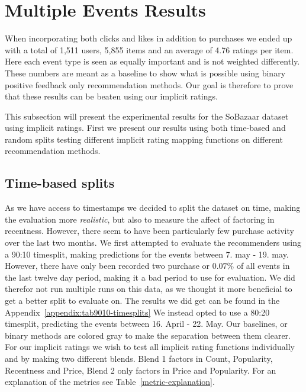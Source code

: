 \section{Multiple Events Results}

When incorporating both clicks and likes in addition to purchases we ended up with a total of 1,511 users, 5,855 items
and an average of 4.76 ratings per item. Here each event type is seen as equally important and is not weighted differently.
These numbers are meant as a baseline to show what is possible using binary positive feedback only recommendation methods.
Our goal is therefore to prove that these results can be beaten using our implicit ratings.

This subsection will present the experimental results for the SoBazaar dataset using implicit ratings. First we present
our results using both time-based and random splits testing different implicit rating mapping functions on different recommendation methods.

\subsection{Time-based splits}

As we have access to timestamps we decided to split the dataset on time, making the evaluation more \textit{realistic}, but also to measure the
affect of factoring in recentness. However, there seem to have been particularly few purchase activity over the last two months. We first attempted to evaluate the recommenders
using a 90:10 timesplit, making predictions for the events between 7. may - 19. may. However, there have only been recorded two purchase or $0.07\%$ of
all events in the last twelve day period, making it a bad period to use for evaluation. We did therefor not run multiple runs on this
data, as we thought it more beneficial to get a better split to evaluate on. The results we did get can be found in the Appendix~\ref{appendix:tab9010-timesplits}
We instead opted to use a 80:20 timesplit, predicting the events between 16. April - 22. May. Our baselines, or binary methods are colored gray to
make the separation between them clearer. For our implicit ratings we wish to test all implicit rating functions individually and by making two different blends.
Blend 1 factors in Count, Popularity, Recentness and Price, Blend 2 only factors in Price and Popularity. For an explanation of the metrics see Table~\ref{metric-explanation}.

